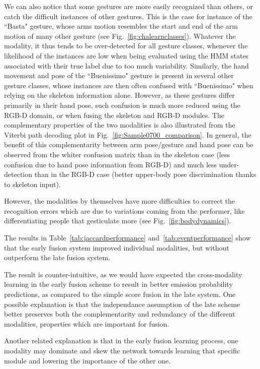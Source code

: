 We can also notice that some gestures are more easily recognized than others,
or catch the difficult instances of other gestures.
This is the case for instance of the ``Basta" gesture,
whose arms motion  resembles the  start and end of the arm motion of many other gesture (see Fig.~\ref{fig:chalearnclasses}).
Whatever the modality, it thus tends to be over-detected for all gesture classes, whenever the
likelihood of the instances are low when being evaluated using the HMM states associated with their true label
due to too much variability.
%
Similarly, the hand movement and pose of the ``Buenissimo" gesture is present in several other gesture classes,
whose instances are then often confused with ``Buenissimo" when relying on the skeleton information alone.
%
However, as these gestures differ primarily in their hand pose, such confusion is much more reduced using the RGB-D domain,
or when fusing  the skeleton and RGB-D modules.
%
The complementary properties of the two modalities is also illustrated from the Viterbi path decoding plot in Fig.~\ref{fig:Sample0700_comparison}.
In general, the benefit of this complementarity between arm pose/gesture and hand pose
can be observed from the whiter confusion matrix than in the skeleton case (less confusion due to hand pose information from RGB-D)
and much less under-detection than in the RGB-D case (better upper-body pose discrimination thanks to skeleton input).
%

However, the modalities by themselves have more difficulties to correct the recognition errors which are due to variations coming from the performer,
like differentiating  people that gesticulate more (see Fig.~\ref{fig:bodydynamics}).

%

The results in Table~\ref{tab:jaccardperformance} and~\ref{tab:eventperformance} show that the early fusion system
improved individual modalities, but without outperform the late fusion system.

%
The result is counter-intuitive, as we would have expected the cross-modality learning in the early fusion scheme
to result in better emission probability predictions, as compared to the simple score fusion in the late system.
%
One possible explanation is that the independance assumption of the late scheme better preserves both
the complementarity and redundancy of the different modalities, properties which are important for fusion.
%

Another related explanation is that in the early fusion learning process,
one modality may dominate and  skew the network towards  learning that specific module and
lowering the importance of the other one.

